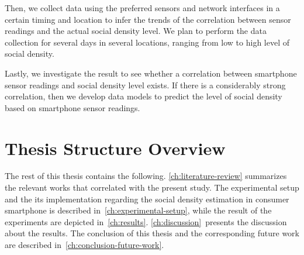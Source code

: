 	Then, we collect data using the preferred sensors and network interfaces in a certain timing and location to infer the trends of the correlation between sensor readings and the actual social density level. We plan to perform the data collection for several days in several locations, ranging from low to high level of social density.

	Lastly, we investigate the result to see whether a correlation between smartphone sensor readings and social density level exists. If there is a considerably strong correlation, then we develop data models to predict the level of social density based on smartphone sensor readings.


\section{Thesis Structure Overview} %
\label{sec:thesis_overview}
The rest of this thesis contains the following.
\autoref{ch:literature-review} summarizes the relevant works that correlated with the present study. The experimental setup and the its implementation regarding the social density estimation in consumer smartphone is described in~\autoref{ch:experimental-setup}, while the result of the experiments are depicted in~\autoref{ch:results}. \autoref{ch:discussion}~presents the discussion about the results. The conclusion of this thesis and the corresponding future work are described in~\autoref{ch:conclusion-future-work}.





